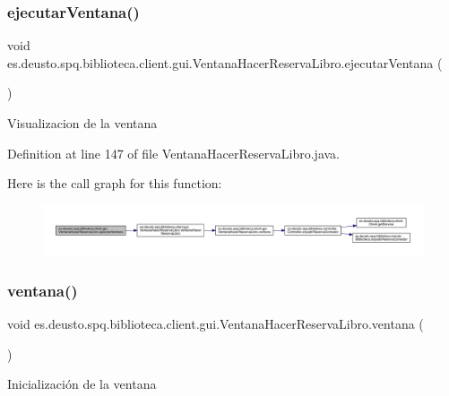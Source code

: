 \subsubsection{\texorpdfstring{ejecutar\+Ventana()}{ejecutarVentana()}}
{\footnotesize\ttfamily void es.\+deusto.\+spq.\+biblioteca.\+client.\+gui.\+Ventana\+Hacer\+Reserva\+Libro.\+ejecutar\+Ventana (\begin{DoxyParamCaption}{ }\end{DoxyParamCaption})}

Visualizacion de la ventana 

Definition at line 147 of file Ventana\+Hacer\+Reserva\+Libro.\+java.

Here is the call graph for this function\+:
\nopagebreak
\begin{figure}[H]
\begin{center}
\leavevmode
\includegraphics[width=350pt]{classes_1_1deusto_1_1spq_1_1biblioteca_1_1client_1_1gui_1_1_ventana_hacer_reserva_libro_ad2b020fc4a4ef8fb18848f75c31836e7_cgraph}
\end{center}
\end{figure}
\mbox{\label{classes_1_1deusto_1_1spq_1_1biblioteca_1_1client_1_1gui_1_1_ventana_hacer_reserva_libro_a62aec2a93b911472883ffb3bb83f3d92}} 
\subsubsection{\texorpdfstring{ventana()}{ventana()}}
{\footnotesize\ttfamily void es.\+deusto.\+spq.\+biblioteca.\+client.\+gui.\+Ventana\+Hacer\+Reserva\+Libro.\+ventana (\begin{DoxyParamCaption}{ }\end{DoxyParamCaption})}

Inicialización de la ventana 

